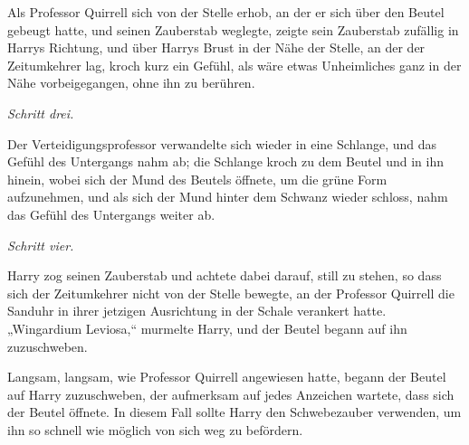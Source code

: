 Als Professor Quirrell sich von der Stelle erhob, an der er sich über den Beutel gebeugt hatte, und seinen Zauberstab weglegte, zeigte sein Zauberstab zufällig in Harrys Richtung, und über Harrys Brust in der Nähe der Stelle, an der der Zeitumkehrer lag, kroch kurz ein Gefühl, als wäre etwas Unheimliches ganz in der Nähe vorbeigegangen, ohne ihn zu berühren.

\emph{Schritt drei.}

Der Verteidigungsprofessor verwandelte sich wieder in eine Schlange, und das Gefühl des Untergangs nahm ab; die Schlange kroch zu dem Beutel und in ihn hinein, wobei sich der Mund des Beutels öffnete, um die grüne Form aufzunehmen, und als sich der Mund hinter dem Schwanz wieder schloss, nahm das Gefühl des Untergangs weiter ab.

\emph{Schritt vier.}

Harry zog seinen Zauberstab und achtete dabei darauf, still zu stehen, so dass sich der Zeitumkehrer nicht von der Stelle bewegte, an der Professor Quirrell die Sanduhr in ihrer jetzigen Ausrichtung in der Schale verankert hatte. „Wingardium Leviosa,“ murmelte Harry, und der Beutel begann auf ihn zuzuschweben.

Langsam, langsam, wie Professor Quirrell angewiesen hatte, begann der Beutel auf Harry zuzuschweben, der aufmerksam auf jedes Anzeichen wartete, dass sich der Beutel öffnete. In diesem Fall sollte Harry den Schwebezauber verwenden, um ihn so schnell wie möglich von sich weg zu befördern.

